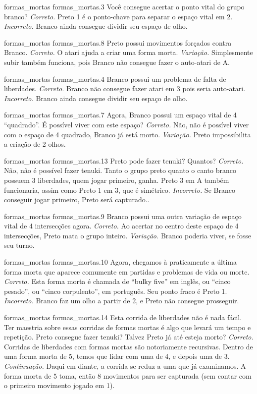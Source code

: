 \problemAnswerDiagram
  {formas_mortas}
  {formas_mortas.3}
  {Você consegue acertar o ponto vital do grupo branco?}
  {\emph{Correto.} Preto 1 é o ponto-chave para separar o espaço vital em 2.}
  {\emph{Incorreto.} Branco ainda consegue dividir seu espaço de olho.}

\problemAnswerDiagram
  {formas_mortas}
  {formas_mortas.8}
  {Preto possui movimentos forçados contra Branco.}
  {\emph{Correto.} O atari ajuda a criar uma forma morta.}
  {\emph{Variação.} Simplesmente subir também funciona, pois Branco não consegue fazer o auto-atari de A.}

\problemAnswerDiagram
  {formas_mortas}
  {formas_mortas.4}
  {Branco possui um problema de falta de liberdades.}
  {\emph{Correto.} Branco não consegue fazer atari em 3 pois seria auto-atari.}
  {\emph{Incorreto.} Branco ainda consegue dividir seu espaço de olho.}

\problemAnswerDiagram
  {formas_mortas}
  {formas_mortas.7}
  {Agora, Branco possui um espaço vital de 4 ``quadrado''. É possível viver com este espaço?}
  {\emph{Correto.} Não, não é possível viver com o espaço de 4 quadrado, Branco já está morto.}
  {\emph{Variação.} Preto impossibilita a criação de 2 olhos.}

\problemAnswerDiagram
  {formas_mortas}
  {formas_mortas.13}
  {Preto pode fazer tenuki? Quantos?}
  {\emph{Correto.} Não, não é possível fazer tenuki. Tanto o grupo preto quanto o canto branco possuem 3 liberdades, quem jogar primeiro, ganha. Preto 3 em A também funcionaria, assim como Preto 1 em 3, que é simétrico.}
  {\emph{Incorreto.} Se Branco conseguir jogar primeiro, Preto será capturado..}

\problemAnswerDiagram
  {formas_mortas}
  {formas_mortas.9}
  {Branco possui uma outra variação de espaço vital de 4 intersecções agora.}
  {\emph{Correto.} Ao acertar no centro deste espaço de 4 intersecções, Preto mata o grupo inteiro.}
  {\emph{Variação.} Branco poderia viver, se fosse seu turno.}

\problemAnswerDiagram
  {formas_mortas}
  {formas_mortas.10}
  {Agora, chegamos à praticamente a última forma morta que aparece comumente em partidas e problemas de vida ou morte.}
  {\emph{Correto.} Esta forma morta é chamada de ``bulky five'' em inglês, ou ``cinco pesado'', ou ``cinco corpulento'', em português. Seu ponto fraco é Preto 1.}
  {\emph{Incorreto.} Branco faz um olho a partir de 2, e Preto não consegue prosseguir.}

\problemAnswerDiagram
  {formas_mortas}
  {formas_mortas.14}
  {Esta corrida de liberdades não é nada fácil. Ter maestria sobre essas corridas de formas mortas é algo que levará um tempo e repetição. Preto consegue fazer tenuki? Talvez Preto já até esteja morto?}
  {\emph{Correto.} Corridas de liberdades com formas mortas são notoriamente recursivas. Dentro de uma forma morta de 5, temos que lidar com uma de 4, e depois uma de 3.}
  {\emph{Continuação.} Daqui em diante, a corrida se reduz a uma que já examinamos. A forma morta de 5 toma, então 8 movimentos para ser capturada (sem contar com o primeiro movimento jogado em 1).}

